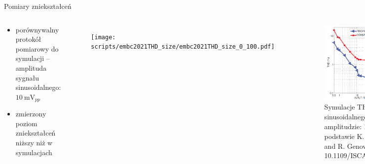 
\begin{frame}{Pomiary zniekształceń}


    \begin{columns}

\vspace{-1em}
        \begin{block}{}
            \begin{itemize}
                \item porównywalny protokół pomiarowy do symulacji -- amplituda sygnału sinusoidalnego: $\SI{10}{\milli\volt_{pp}}$
                \item zmierzony poziom zniekształceń niższy niż w symulacjach
            \end{itemize}
        \end{block}
        \vspace{-1em}

            \begin{figure}[H]
                \centering
                \texttt{[image: scripts/embc2021THD\_size/embc2021THD\_size\_0\_100.pdf]}
            \end{figure}   


        \begin{figure}[H]
            \centering
            \includegraphics[scale=0.2]{Figures/genovTHD.png}
            \caption{Symulacje THD dla sygnału sinusoidalnego o amplitudzie: $\SI{1.4}{\milli\volt_{pp}}$. Na podstawie K. Abdelhalim and R. Genov, doi: 10.1109/ISCAS.2012.6271415}
        \end{figure}
\end{columns}

\end{frame}



